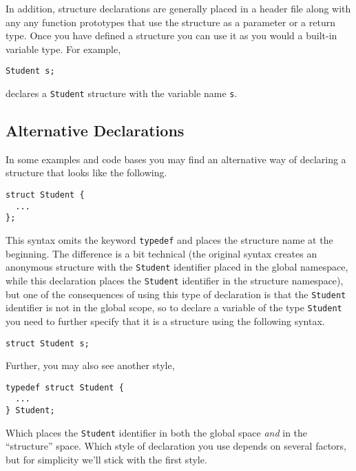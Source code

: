 In addition, structure declarations are generally placed in a header 
file along with any any function prototypes that use the structure as 
a parameter or a return type.  Once you have defined a structure you
can use it as you would a built-in variable type.  For example, 

\texttt{Student s;}

declares a \texttt{Student} structure with the variable
name \texttt{s}.

\subsection{Alternative Declarations}

In some examples and code bases you may find an alternative way
of declaring a structure that looks like the following.

\begin{verbatim}
struct Student {
  ...
};
\end{verbatim}

This syntax omits the keyword \texttt{typedef} and places
the structure name at the beginning.  The difference is a bit 
technical (the original syntax creates an anonymous structure
with the \texttt{Student} identifier placed in the 
global namespace, while this declaration places the
\texttt{Student} identifier in the structure namespace), 
but one of the consequences of using this type of
declaration is that the \texttt{Student} identifier
is not in the global scope, so to declare a variable of the
type \texttt{Student} you need to further specify that
it is a structure using the following syntax.

\texttt{struct Student s;}

Further, you may also see another style, 

\begin{verbatim}
typedef struct Student {
  ...
} Student;
\end{verbatim}

Which places the \texttt{Student} identifier in both
the global space \emph{and} in the ``structure'' space.  
Which style of declaration you use depends on several factors, 
but for simplicity we'll stick with the first style.


